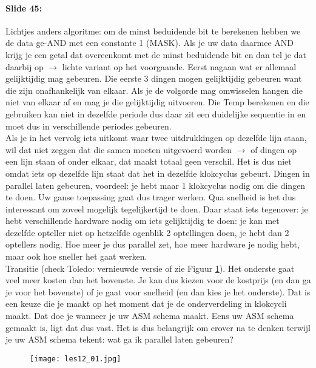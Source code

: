 \documentclass[10pt,a4paper]{book}
\begin{document}
\paragraph{Slide 45:} Lichtjes anders algoritme: om de minst beduidende bit te berekenen hebben we de data ge-AND met een constante 1 (MASK). Als je uw data daarmee AND krijg je een getal dat overeenkomt met de minst beduidende bit en dan tel je dat daarbij op $\rightarrow$ lichte variant op het voorgaande. Eerst nagaan wat er allemaal gelijktijdig mag gebeuren. Die eerste 3 dingen mogen gelijktijdig gebeuren want die zijn onafhankelijk van elkaar. Als je de volgorde mag omwisselen hangen die niet van elkaar af en mag je die gelijktijdig uitvoeren.  Die Temp berekenen en die gebruiken kan niet in dezelfde periode dus daar zit een duidelijke sequentie in en moet dus in verschillende periodes gebeuren.\\
Als je in het vervolg iets uitkomt waar twee uitdrukkingen op dezelfde lijn staan, wil dat niet zeggen dat die samen moeten uitgevoerd worden $\rightarrow$ of dingen op een lijn staan of onder elkaar, dat maakt totaal geen verschil. Het is dus niet omdat iets op dezelfde lijn staat dat het in dezelfde klokcyclus gebeurt. Dingen in parallel laten gebeuren, voordeel: je hebt maar 1 klokcyclus nodig om die dingen te doen. Uw ganse toepassing gaat dus trager werken. Qua snelheid is het dus interessant om zoveel mogelijk tegelijkertijd te doen. Daar staat iets tegenover: je hebt verschillende hardware nodig om iets gelijktijdig te doen: je kan met dezelfde opteller niet op hetzelfde ogenblik 2 optellingen doen, je hebt dan 2 optellers nodig. Hoe meer je dus parallel zet, hoe meer hardware je nodig hebt, maar ook hoe sneller het gaat werken.\\
Transitie (check Toledo: vernieuwde versie of zie Figuur \ref{les12_01}). Het onderste gaat veel meer kosten dan het bovenste. Je kan dus kiezen voor de kostprijs (en dan ga je voor het bovenste) of je gaat voor snelheid (en dan kies je het onderste). Dat is een keuze die je maakt op het moment dat je de onderverdeling in klokcycli maakt. Dat doe je wanneer je uw ASM schema maakt. Eens uw ASM schema gemaakt is, ligt dat dus vast. Het is dus belangrijk om erover na te denken terwijl je uw ASM schema tekent: wat ga ik parallel laten gebeuren?

\begin{figure}[ht!]
\centering
\texttt{[image: les12\_01.jpg]}
\label{les12_01}
\end{figure}
\end{document}
